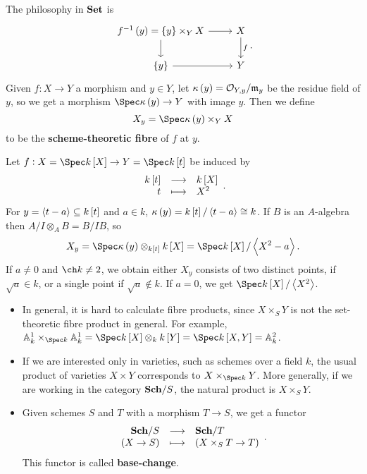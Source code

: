 The philosophy in $ \textbf{Set} $ is
$$
\begin{tikzcd}
f^{-1}\br{y} = \cbr{y} \times_Y X \arrow{r} \arrow{d} & X \arrow{d}{f} \\
\cbr{y} \arrow{r} & Y
\end{tikzcd}.
$$
Given $ f : X \to Y $ a morphism and $ y \in Y $, let $ \kappa\br{y} = \OOO_{Y, y} / \mmm_y $ be the residue field of $ y $, so we get a morphism $ \Spec \kappa\br{y} \to Y $ with image $ y $. Then we define
$$ X_y = \Spec \kappa\br{y} \times_Y X $$
to be the \textbf{scheme-theoretic fibre} of $ f $ at $ y $.

\begin{example*}
Let $ f : X = \Spec k\sbr{X} \to Y = \Spec k\sbr{t} $ be induced by
$$ \function{k\sbr{t}}{k\sbr{X}}{t}{X^2}. $$
For $ y = \abr{t - a} \subseteq k\sbr{t} $ and $ a \in k $, $ \kappa\br{y} = k\sbr{t} / \abr{t - a} \cong k $. If $ B $ is an $ A $-algebra then $ A / I \otimes_A B = B / IB $, so
$$ X_y = \Spec \kappa\br{y} \otimes_{k\sbr{t}} k\sbr{X} = \Spec k\sbr{X} / \abr{X^2 - a}. $$
If $ a \ne 0 $ and $ \ch k \ne 2 $, we obtain either $ X_y $ consists of two distinct points, if $ \sqrt{a} \in k $, or a single point if $ \sqrt{a} \notin k $. If $ a = 0 $, we get $ \Spec k\sbr{X} / \abr{X^2} $.
\end{example*}

\begin{remark*}
\hfill
\begin{itemize}
\item In general, it is hard to calculate fibre products, since $ X \times_S Y $ is not the set-theoretic fibre product in general. For example, $ \AA_k^1 \times_{\Spec k} \AA_k^1 = \Spec k\sbr{X} \otimes_k k\sbr{Y} = \Spec k\sbr{X, Y} = \AA_k^2 $.
\item If we are interested only in varieties, such as schemes over a field $ k $, the usual product of varieties $ X \times Y $ corresponds to $ X \times_{\Spec k} Y $. More generally, if we are working in the category $ \textbf{Sch} / S $, the natural product is $ X \times_S Y $.
\item Given schemes $ S $ and $ T $ with a morphism $ T \to S $, we get a functor
$$ \function{\Sch / S}{\Sch / T}{\br{X \to S}}{\br{X \times_S T \to T}}. $$
This functor is called \textbf{base-change}.
\end{itemize}
\end{remark*}

\pagebreak


